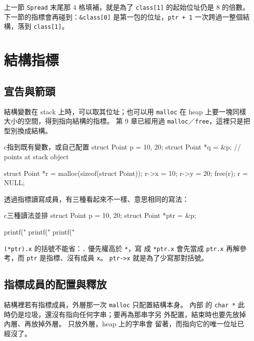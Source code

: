 上一節 \texttt{Spread} 末尾那 $4$ 格填補，就是為了 \texttt{class[1]}
的起始位址仍是 $8$ 的倍數。 下一節的指標會再碰到：\texttt{\&class[0]}
是第一包的位址，\texttt{ptr + 1} 一次跨過一整個結構，落到
\texttt{class[1]}。

\section{結構指標}
\label{sec:struct-pointer}

\subsection{宣告與箭頭}

結構變數在 stack 上時，可以取其位址；也可以用 \texttt{malloc} 在
heap 上要一塊同樣大小的空間，得到指向結構的指標。 第 9 章已經用過
\texttt{malloc}／\texttt{free}，這裡只是把型別換成結構。

\begin{code}{c}{指到既有變數，或自己配置}
struct Point p = {10, 20};
struct Point *q = &p;     // points at stack object

struct Point *r = malloc(sizeof(struct Point));
r->x = 10;
r->y = 20;
free(r);
r = NULL;
\end{code}

透過指標讀寫成員，有三種看起來不一樣、意思相同的寫法：

\begin{code}{c}{三種讀法並排}
struct Point p = {10, 20};
struct Point *ptr = &p;

printf("%
printf("%
printf("%
\end{code}

\texttt{(*ptr).x} 的括號不能省：\texttt{.} 優先權高於 \texttt{*}，寫
成 \texttt{*ptr.x} 會先當成 \texttt{ptr.x} 再解參考，而 \texttt{ptr}
是指標、沒有成員 \texttt{x}。 \texttt{ptr->x} 就是為了少寫那對括號。


\subsection{指標成員的配置與釋放}

結構裡若有指標成員，外層那一次 \texttt{malloc} 只配置結構本身。 內部
的 \texttt{char *} 此時仍是垃圾，還沒有指向任何字串；要再為那串字另
外配置，結束時也要先放掉內層、再放掉外層。 只放外層，heap 上的字串會
留著，而指向它的唯一位址已經沒了。

